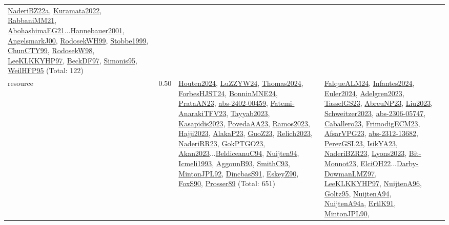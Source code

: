{\begin{longtable}{p{3cm}r>{\raggedright\arraybackslash}p{6cm}>{\raggedright\arraybackslash}p{6cm}>{\raggedright\arraybackslash}p{8cm}}
\hyperref[detail:NaderiBZ22a]{NaderiBZ22a}, \hyperref[detail:Kuramata2022]{Kuramata2022}, \hyperref[detail:RabbaniMM21]{RabbaniMM21}, \hyperref[detail:AbohashimaEG21]{AbohashimaEG21}...\hyperref[detail:Hannebauer2001]{Hannebauer2001}, \hyperref[detail:AngelsmarkJ00]{AngelsmarkJ00}, \hyperref[detail:RodosekWH99]{RodosekWH99}, \hyperref[detail:Stobbe1999]{Stobbe1999}, \hyperref[detail:ChunCTY99]{ChunCTY99}, \hyperref[detail:RodosekW98]{RodosekW98}, \hyperref[detail:LeeKLKKYHP97]{LeeKLKKYHP97}, \hyperref[detail:BeckDF97]{BeckDF97}, \hyperref[detail:Simonis95]{Simonis95}, \hyperref[detail:WeilHFP95]{WeilHFP95} (Total: 122)\\
\index{resource}\index{Scheduling!resource}resource &  0.50 & \hyperref[detail:Houten2024]{Houten2024}, \hyperref[detail:LuZZYW24]{LuZZYW24}, \hyperref[detail:Thomas2024]{Thomas2024}, \hyperref[detail:ForbesHJST24]{ForbesHJST24}, \hyperref[detail:BonninMNE24]{BonninMNE24}, \hyperref[detail:PrataAN23]{PrataAN23}, \hyperref[detail:abs-2402-00459]{abs-2402-00459}, \hyperref[detail:Fatemi-AnarakiTFV23]{Fatemi-AnarakiTFV23}, \hyperref[detail:Tayyab2023]{Tayyab2023}, \hyperref[detail:Kasapidis2023]{Kasapidis2023}, \hyperref[detail:PovedaAA23]{PovedaAA23}, \hyperref[detail:Ramos2023]{Ramos2023}, \hyperref[detail:Hajji2023]{Hajji2023}, \hyperref[detail:AlakaP23]{AlakaP23}, \hyperref[detail:GuoZ23]{GuoZ23}, \hyperref[detail:Relich2023]{Relich2023}, \hyperref[detail:NaderiRR23]{NaderiRR23}, \hyperref[detail:GokPTGO23]{GokPTGO23}, \hyperref[detail:Akan2023]{Akan2023}...\hyperref[detail:BeldiceanuC94]{BeldiceanuC94}, \hyperref[detail:Nuijten94]{Nuijten94}, \hyperref[detail:Icmeli1993]{Icmeli1993}, \hyperref[detail:AggounB93]{AggounB93}, \hyperref[detail:SmithC93]{SmithC93}, \hyperref[detail:MintonJPL92]{MintonJPL92}, \hyperref[detail:DincbasS91]{DincbasS91}, \hyperref[detail:EskeyZ90]{EskeyZ90}, \hyperref[detail:FoxS90]{FoxS90}, \hyperref[detail:Prosser89]{Prosser89} (Total: 651) & \hyperref[detail:FalqueALM24]{FalqueALM24}, \hyperref[detail:Infantes2024]{Infantes2024}, \hyperref[detail:Euler2024]{Euler2024}, \hyperref[detail:Adelgren2023]{Adelgren2023}, \hyperref[detail:TasselGS23]{TasselGS23}, \hyperref[detail:AbreuNP23]{AbreuNP23}, \hyperref[detail:Liu2023]{Liu2023}, \hyperref[detail:Schweitzer2023]{Schweitzer2023}, \hyperref[detail:abs-2306-05747]{abs-2306-05747}, \hyperref[detail:Caballero23]{Caballero23}, \hyperref[detail:FrimodigECM23]{FrimodigECM23}, \hyperref[detail:AfsarVPG23]{AfsarVPG23}, \hyperref[detail:abs-2312-13682]{abs-2312-13682}, \hyperref[detail:PerezGSL23]{PerezGSL23}, \hyperref[detail:IsikYA23]{IsikYA23}, \hyperref[detail:NaderiBZR23]{NaderiBZR23}, \hyperref[detail:Lyons2023]{Lyons2023}, \hyperref[detail:Bit-Monnot23]{Bit-Monnot23}, \hyperref[detail:ElciOH22]{ElciOH22}...\hyperref[detail:Darby-DowmanLMZ97]{Darby-DowmanLMZ97}, \hyperref[detail:LeeKLKKYHP97]{LeeKLKKYHP97}, \hyperref[detail:NuijtenA96]{NuijtenA96}, \hyperref[detail:Goltz95]{Goltz95}, \hyperref[detail:NuijtenA94]{NuijtenA94}, \hyperref[detail:NuijtenA94a]{NuijtenA94a}, \hyperref[detail:ErtlK91]{ErtlK91}, \hyperref[detail:MintonJPL90]{MintonJPL90}, 
\end{longtable}}
